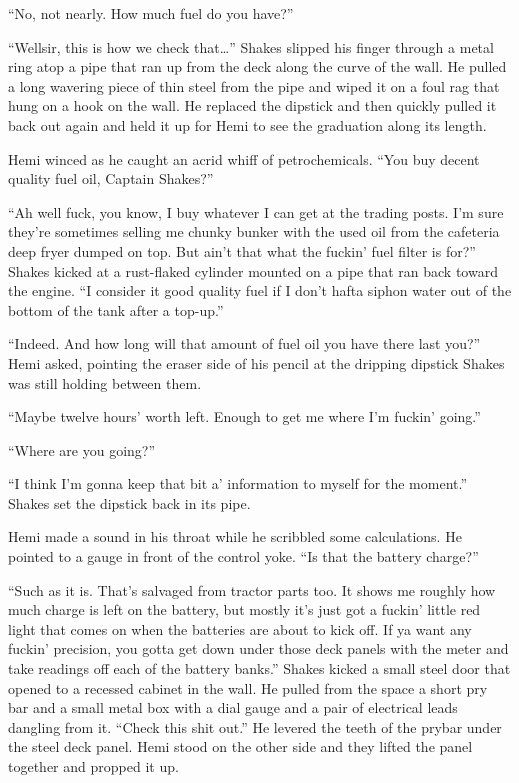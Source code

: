 \documentclass[
]{scrbook}
\begin{document}
``No, not nearly. How much fuel do you have?''

``Wellsir, this is how we check that\ldots{}'' Shakes slipped his finger
through a metal ring atop a pipe that ran up from the deck along the
curve of the wall. He pulled a long wavering piece of thin steel from
the pipe and wiped it on a foul rag that hung on a hook on the wall. He
replaced the dipstick and then quickly pulled it back out again and held
it up for Hemi to see the graduation along its length.

Hemi winced as he caught an acrid whiff of petrochemicals. ``You buy
decent quality fuel oil, Captain Shakes?''

``Ah well fuck, you know, I buy whatever I can get at the trading posts.
I'm sure they're sometimes selling me chunky bunker with the used oil
from the cafeteria deep fryer dumped on top. But ain't that what the
fuckin' fuel filter is for?'' Shakes kicked at a rust-flaked cylinder
mounted on a pipe that ran back toward the engine. ``I consider it good
quality fuel if I don't hafta siphon water out of the bottom of the tank
after a top-up.''

``Indeed. And how long will that amount of fuel oil you have there last
you?'' Hemi asked, pointing the eraser side of his pencil at the
dripping dipstick Shakes was still holding between them.

``Maybe twelve hours' worth left. Enough to get me where I'm fuckin'
going.''

``Where are you going?''

``I think I'm gonna keep that bit a' information to myself for the
moment.'' Shakes set the dipstick back in its pipe.

Hemi made a sound in his throat while he scribbled some calculations. He
pointed to a gauge in front of the control yoke. ``Is that the battery
charge?''

``Such as it is. That's salvaged from tractor parts too. It shows me
roughly how much charge is left on the battery, but mostly it's just got
a fuckin' little red light that comes on when the batteries are about to
kick off. If ya want any fuckin' precision, you gotta get down under
those deck panels with the meter and take readings off each of the
battery banks.'' Shakes kicked a small steel door that opened to a
recessed cabinet in the wall. He pulled from the space a short pry bar
and a small metal box with a dial gauge and a pair of electrical leads
dangling from it. ``Check this shit out.'' He levered the teeth of the
prybar under the steel deck panel. Hemi stood on the other side and they
lifted the panel together and propped it up.
\end{document}
